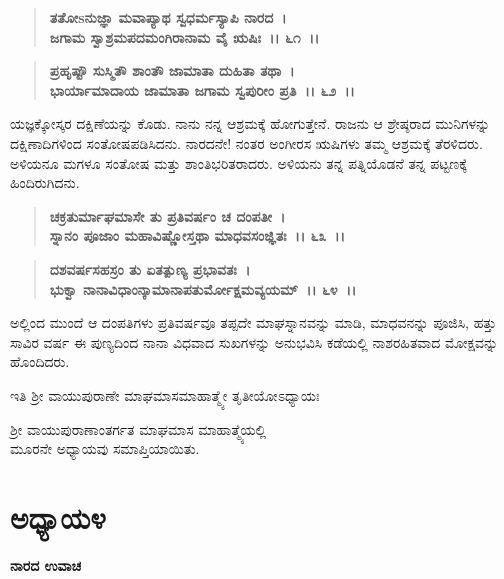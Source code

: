 \begin{verse}
\textbf{ತತೋsನುಜ್ಞಾ ಮವಾಪ್ಯಾಥ ಸ್ವಧರ್ಮಸ್ಯಾಪಿ ನಾರದ~।}\\\textbf{ಜಗಾಮ ಸ್ವಾಶ್ರಮಪದಮಂಗಿರಾನಾಮ ವೈ ಋಷಿಃ~।। ೬೧~।। }
\end{verse}

\begin{verse}
\textbf{ಪ್ರಹೃಷ್ಟೌ ಸುಸ್ಮಿತೌ ಶಾಂತೌ ಜಾಮಾತಾ ದುಹಿತಾ ತಥಾ~।}\\\textbf{ಭಾರ್ಯಾಮಾದಾಯ ಜಾಮಾತಾ ಜಗಾಮ ಸ್ವಪುರೀಂ ಪ್ರತಿ~।। ೬೨~।।}
\end{verse}

ಯಜ್ಞಕ್ಕೋಸ್ಕರ ದಕ್ಷಿಣೆಯನ್ನು ಕೊಡು. ನಾನು ನನ್ನ ಆಶ್ರಮಕ್ಕೆ ಹೋಗುತ್ತೇನೆ. ರಾಜನು ಆ ಶ್ರೇಷ್ಠರಾದ ಮುನಿಗಳನ್ನು ದಕ್ಷಿಣಾದಿಗಳಿಂದ ಸಂತೋಷಪಡಿಸಿದನು. ನಾರದನೇ! ನಂತರ ಅಂಗೀರಸ ಋಷಿಗಳು ತಮ್ಮ ಆಶ್ರಮಕ್ಕೆ ತೆರಳಿದರು. ಅಳಿಯನೂ ಮಗಳೂ ಸಂತೋಷ ಮತ್ತು ಶಾಂತಿಭರಿತರಾದರು. ಅಳಿಯನು ತನ್ನ ಪತ್ನಿಯೊಡನೆ ತನ್ನ ಪಟ್ಟಣಕ್ಕೆ ಹಿಂದಿರುಗಿದನು.

\begin{verse}
\textbf{ಚಕ್ರತುರ್ಮಾಘಮಾಸೇ ತು ಪ್ರತಿವರ್ಷಂ ಚ ದಂಪತೀ~।}\\\textbf{ಸ್ನಾನಂ ಪೂಜಾಂ ಮಹಾವಿಷ್ಣೋಸ್ತಥಾ ಮಾಧವಸಂಜ್ಞಿತಃ~।। ೬೩~।। }
\end{verse}

\begin{verse}
\textbf{ದಶವರ್ಷಸಹಸ್ರಂ ತು ಏತತ್ಪುಣ್ಯ ಪ್ರಭಾವತಃ~।}\\\textbf{ಭುಕ್ವಾ ನಾನಾವಿಧಾಂನ್ಕಾಮಾನಾಪತುರ್ಮೋಕ್ಷಮವ್ಯಯಮ್~।। ೬೪~।।}
\end{verse}

ಅಲ್ಲಿಂದ ಮುಂದೆ ಆ ದಂಪತಿಗಳು ಪ್ರತಿವರ್ಷವೂ ತಪ್ಪದೇ ಮಾಘಸ್ನಾನವನ್ನು ಮಾಡಿ, ಮಾಧವನನ್ನು ಪೂಜಿಸಿ, ಹತ್ತು ಸಾವಿರ ವರ್ಷ ಈ ಪುಣ್ಯದಿಂದ ನಾನಾ ವಿಧವಾದ ಸುಖಗಳನ್ನು ಅನುಭವಿಸಿ ಕಡೆಯಲ್ಲಿ ನಾಶರಹಿತವಾದ ಮೋಕ್ಷವನ್ನು ಹೊಂದಿದರು.

\begin{center}
ಇತಿ ಶ‍್ರೀ ವಾಯುಪುರಾಣೇ ಮಾಘಮಾಸಮಾಹಾತ್ಮ್ಯೇ ತೃತೀಯೋಽಧ್ಯಾಯಃ
\end{center}

\begin{center}
ಶ‍್ರೀ ವಾಯುಪುರಾಣಾಂತರ್ಗತ ಮಾಘಮಾಸ ಮಾಹಾತ್ಮ್ಯೆಯಲ್ಲಿ \\ ಮೂರನೇ ಅಧ್ಯಾಯವು ಸಮಾಪ್ತಿಯಾಯಿತು.
\end{center}

\newpage

\section*{ಅಧ್ಯಾಯ೪}

\emptypage

\begin{flushleft}
\textbf{ನಾರದ ಉವಾಚ}
\end{flushleft}

